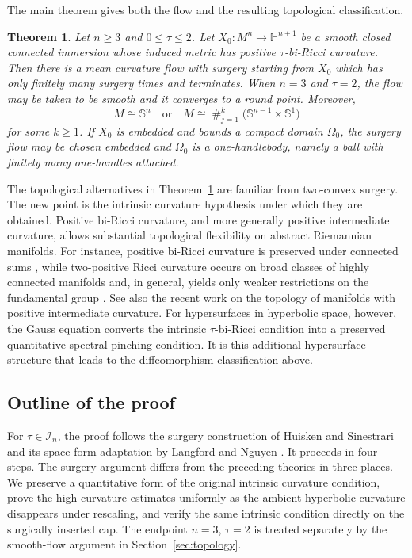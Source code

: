\documentclass[11pt,reqno]{amsart}
\newtheorem{theorem}[proposition]{Theorem}
\theoremstyle{definition}
\theoremstyle{remark}
\numberwithin{equation}{section}
\newcommand{\Hh}{\mathbb H}
\newcommand{\Sph}{\mathbb S}
\begin{document}
The main theorem gives both the flow and the resulting topological
classification.

\begin{theorem}%
\label{thm:taubiric-main}
Let $n\geq3$ and $0\leq\tau\leq2$.  Let
$X_0:M^n\to\Hh^{n+1}$ be a smooth closed connected immersion whose induced
metric has positive $\tau$-bi-Ricci curvature.  Then there is a mean curvature
flow with surgery starting from $X_0$ which has only finitely many surgery
times and terminates.  When $n=3$ and $\tau=2$, the flow
may be taken to be smooth and it converges to a round point.  Moreover,
\begin{equation*}
 M\cong\Sph^n
 \quad\text{or}\quad
 M\cong\mathop{\#}_{j=1}^{k}
       \bigl(\Sph^{n-1}\times\Sph^1\bigr)
\end{equation*}
for some $k\geq1$.  If $X_0$ is embedded and bounds a compact domain
$\Omega_0$, the surgery flow may be chosen embedded and $\Omega_0$ is a
one-handlebody, namely a ball with finitely many one-handles attached.
\end{theorem}

The topological alternatives in Theorem~\ref{thm:taubiric-main} are familiar
from two-convex surgery.  The new point is the intrinsic curvature
hypothesis under which they are obtained.  Positive bi-Ricci curvature,
and more generally positive intermediate curvature, allows substantial
topological flexibility on abstract Riemannian manifolds.  For instance,
positive bi-Ricci curvature is preserved under connected sums
\cite{ShenYe97}, while two-positive Ricci curvature occurs on broad
classes of highly connected manifolds \cite{CW22} and, in
general, yields only weaker restrictions on the fundamental group
\cite{Wolf}.  See also the recent work \cite{MWY26} on the topology
of manifolds with positive intermediate curvature.  For hypersurfaces
in hyperbolic space, however, the Gauss equation converts the intrinsic
$\tau$-bi-Ricci condition into a preserved quantitative spectral
pinching condition.  It is this additional hypersurface structure that
leads to the diffeomorphism classification above.

\subsection{Outline of the proof}

For $\tau\in\mathcal I_n$, the proof follows the surgery construction of
Huisken and Sinestrari \cite{HS09} and its space-form adaptation by Langford
and Nguyen \cite{LN21}.  It proceeds in four steps.  The surgery argument
differs from the preceding theories in three places.  We preserve a
quantitative form of the original intrinsic curvature condition, prove the
high-curvature estimates uniformly as the ambient hyperbolic curvature
disappears under rescaling, and verify the same intrinsic condition directly
on the surgically inserted cap.  The endpoint $n=3$, $\tau=2$ is treated separately by the smooth-flow argument in Section~\ref{sec:topology}.
\end{document}

